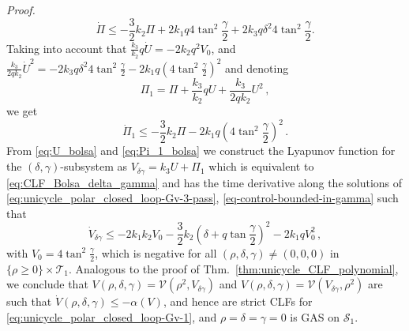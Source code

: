 \documentclass[journal,twoside,web]{ieeecolor}
\theoremstyle{definition}
\newcommand{\abs}[1]{\left\lvert#1\right\rvert}
\renewenvironment{proof}[1][Proof]{\par\pushQED{\qed}\normalfont\textit{#1.}~}{\popQED\par}
\begin{document}
\begin{proof}
\begin{equation}
\dot\Pi
\leq - \frac{3}{2} k_2 \Pi + 2 k_1 q  4 \tan^2 \frac{\gamma}{2} +   2 k_3 q \delta^2 4 \tan^2 \frac{\gamma}{2}.
\end{equation}
Taking into account that $\frac{k_3 }{k_2} q \dot U = - 2k_2 q^2 V_0$, and $\frac{k_3}{2q k_2 } \dot{U}^2 = -2k_3 q \delta^2 4 \tan^2 \frac{\gamma}{2} - 2k_1 q \left(4 \tan^2 \frac{\gamma}{2}\right)^2$ and denoting
\begin{equation}
\Pi_1 = \Pi + \frac{k_3 }{k_2} q  U  + \frac{k_3 }{2 q k_2} U^2\,, \label{eq:Pi_1_bolsa}
\end{equation}
we get
\begin{equation}
\dot\Pi_1 \leq - \frac{3}{2}k_2\Pi - 2 k_1 q \left(4 \tan^2 \frac{\gamma}{2}\right)^2\,.
\end{equation}
From \eqref{eq:U_bolsa} and \eqref{eq:Pi_1_bolsa} we construct the Lyapunov function for the $(\delta, \gamma)$-subsystem as $V_{\delta \gamma} = k_3 U + \Pi_1$ which is equivalent to \eqref{eq:CLF_Bolsa_delta_gamma} 
and has the time derivative along the solutions of \eqref{eq:unicycle_polar_closed_loop-Gv-3-pass}, \eqref{eq-control-bounded-in-gamma} such that
\begin{equation}
    \dot V_{\delta \gamma} \le  - 2k_1 k_2 V_0  - \frac{3}{2}k_2 \left(\delta + q \tan \frac{\gamma}{2}\right)^2 - 2k_1 q V_0^2\,,
\label{eq:V_dot_Bolsa}
\end{equation} 
with $V_0 = 4 \tan^2\frac{\gamma}{2}$, which is negative for all $(\rho,\delta, \gamma) \ne (0,0,0)$ in $\{\rho \ge 0\} \times \mathcal{T}_1$. Analogous to the proof of Thm.~\ref{thm:unicycle_CLF_polynomial}, we conclude that $V(\rho, \delta, \gamma) = \mathcal{V}(\rho^2, V_{\delta \gamma})$ and $V(\rho, \delta, \gamma) = \mathcal{V}(V_{\delta \gamma},\rho^2)$ are such that $\dot{V}(\rho,\delta,\gamma) \le - \alpha(V)$, and hence are strict CLFs for \eqref{eq:unicycle_polar_closed_loop-Gv-1}, and  
$\rho =  \delta = \gamma = 0$ is GAS on $\mathcal{S}_1$.
\end{proof}
\end{document}
